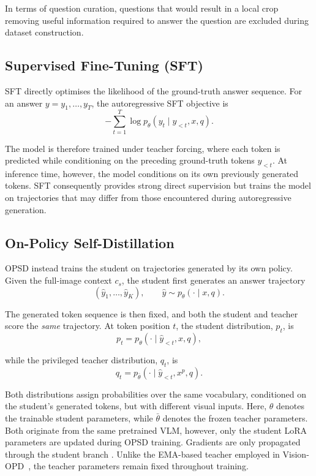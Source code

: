 In terms of question curation, questions that would result in a local crop removing useful 
information required to answer the question are excluded during dataset construction.

\subsection{Supervised Fine-Tuning (SFT)}

SFT directly optimises the likelihood of the ground-truth answer sequence. For an answer 
$y=y_1,\ldots,y_T$, the autoregressive SFT objective is
\[
-\sum_{t=1}^{T}
\log
p_\theta
\left(
y_t
\mid
y_{<t},x,q
\right).
\]

The model is therefore trained under teacher forcing, where each token is predicted while 
conditioning on the preceding ground-truth tokens $y_{<t}$. At inference time, however, the 
model conditions on its own previously generated tokens. SFT consequently provides strong direct
supervision but trains the model on trajectories that may differ from those encountered during
autoregressive generation.

\subsection{On-Policy Self-Distillation}

OPSD instead trains the student on trajectories generated by its own policy. Given the full-image
context $c_s$, the student first generates an answer trajectory
\[
(\hat{y}_1,\ldots,\hat{y}_K),
\qquad
\hat{y}
\sim
p_\theta(\cdot\mid x,q).
\]

The generated token sequence is then fixed, and both the student and teacher score the 
\emph{same} trajectory. At token position $t$, the student distribution, $p_t$,  is
\[p_t = 
p_\theta
\left(
\cdot
\mid
\hat{y}_{<t},x,q
\right),
\]

while the privileged teacher distribution, $q_t$, is
\[q_t = 
p_{\bar{\theta}}
\left(
\cdot
\mid
\hat{y}_{<t},x^{p},q
\right).
\]

Both distributions assign probabilities over the same vocabulary, conditioned on the 
student's generated tokens, but with different visual inputs. 
Here, $\theta$ denotes the trainable student parameters, while $\bar{\theta}$ denotes the 
frozen teacher parameters. Both originate from the same pretrained VLM, however, only the student
LoRA parameters are updated during OPSD training. Gradients are only propagated through the
student branch \parencite{zhao2601self}. Unlike the EMA-based teacher employed in
Vision-OPD~\cite{yuan2026vision}, the teacher parameters remain fixed throughout training.


